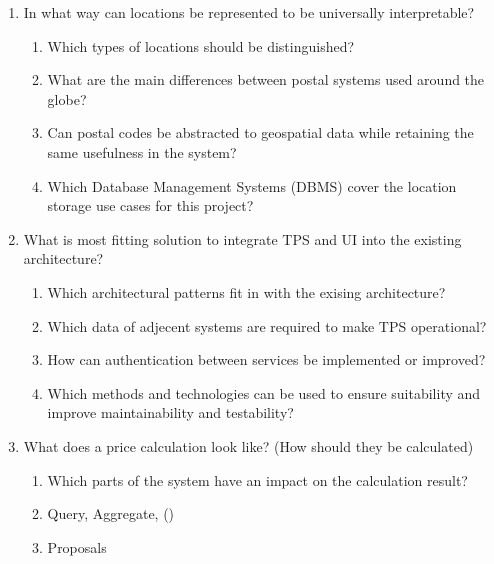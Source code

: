 \begin{enumerate}

	\item In what way can locations be represented to be universally interpretable?
		\begin{enumerate}[label*=\arabic*.]
			\item Which types of locations should be distinguished?
			\item What are the main differences between postal systems used around the globe?
			\item Can postal codes be abstracted to geospatial data while retaining the same usefulness in the system?
			\item Which Database Management Systems (DBMS) cover the location storage use cases for this project?

		\end{enumerate}

	\item What is most fitting solution to integrate TPS and UI into the existing architecture?
		\begin{enumerate}[label*=\arabic*.]
			\item Which architectural patterns fit in with the exising architecture?
			\item Which data of adjecent systems are required to make TPS operational?
			\item How can authentication between services be implemented or improved?
			\item Which methods and technologies can be used to ensure suitability and improve maintainability and testability?
		\end{enumerate}

	\item What does a price calculation look like? (How should they be calculated)
		\begin{enumerate}[label*=\arabic*.]
			\item Which parts of the system have an impact on the calculation result?
			\item Query, Aggregate, ()
			\item Proposals
		\end{enumerate}


\end{enumerate}
